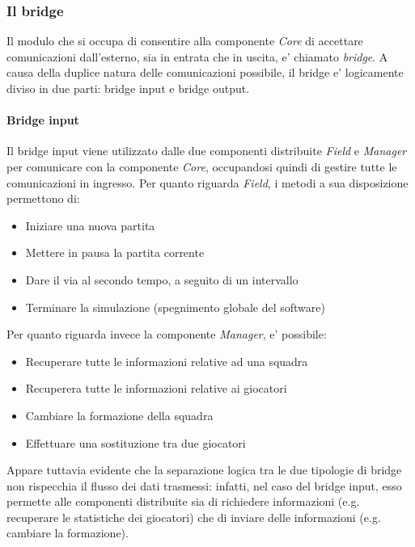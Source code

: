 \subsubsection{Il bridge}
\label{sec:analisi_distribuzione_bridge}

Il modulo che si occupa di consentire alla componente \textit{Core} di accettare comunicazioni dall'esterno, sia in entrata che in uscita, e' chiamato \textit{bridge}. A causa della duplice natura delle comunicazioni possibile, il bridge e' logicamente diviso in due parti: bridge input e bridge output.

\paragraph{Bridge input}\label{sec:analisi_distribuzione_bridge_input} Il bridge input viene utilizzato dalle due componenti distribuite \textit{Field} e \textit{Manager} per comunicare con la componente \textit{Core}, occupandosi quindi di gestire tutte le comunicazioni in ingresso. Per quanto riguarda \textit{Field}, i metodi a sua disposizione permettono di:

\begin{itemize}
	\item Iniziare una nuova partita
	\item Mettere in pausa la partita corrente
	\item Dare il via al secondo tempo, a seguito di un intervallo
	\item Terminare la simulazione (spegnimento globale del software)
\end{itemize}

\noindent Per quanto riguarda invece la componente \textit{Manager}, e' possibile:

\begin{itemize}
	\item Recuperare tutte le informazioni relative ad una squadra
	\item Recuperera tutte le informazioni relative ai giocatori
	\item Cambiare la formazione della squadra
	\item Effettuare una sostituzione tra due giocatori
\end{itemize}

Appare tuttavia evidente che la separazione logica tra le due tipologie di bridge non rispecchia il flusso dei dati trasmessi: infatti, nel caso del bridge input, esso permette alle componenti distribuite sia di richiedere informazioni (e.g. recuperare le statistiche dei giocatori) che di inviare delle informazioni (e.g. cambiare la formazione).\\

